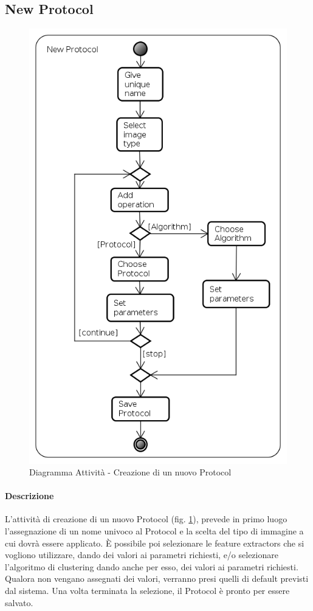 \subsection{New Protocol}
\label{newPr}
\begin{figure}[!h]
\centering
\includegraphics[width=0.6\linewidth]{./Content/Immagini/New_Protocol}
\caption{Diagramma Attività - Creazione di un nuovo Protocol}
\label{newProtocol}
\end{figure}
\paragraph{Descrizione\\}
L'attività di creazione di un nuovo Protocol\glossario{} (fig. \ref{newProtocol}), prevede in primo luogo l'assegnazione di un nome univoco al Protocol\glossario{} e la scelta del tipo di immagine a cui dovrà essere applicato. \`E possibile poi selezionare le feature extractors\glossario{} che si vogliono utilizzare, dando dei valori ai parametri richiesti, e/o selezionare l'algoritmo di clustering\glossario{} dando anche per esso, dei valori ai parametri richiesti. Qualora non vengano assegnati dei valori, verranno presi quelli di default previsti dal sistema. Una volta terminata la selezione, il Protocol\glossario{} è pronto per essere salvato.
\pagebreak

